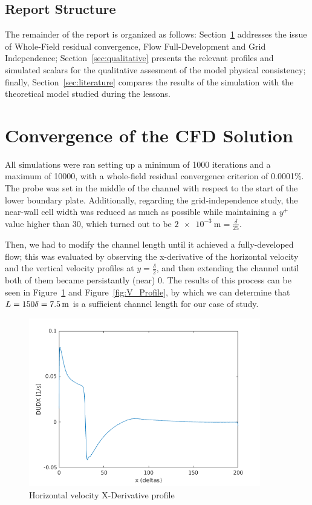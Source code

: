 \documentclass[12pt]{article}
\begin{document}
        \subsection{Report Structure}

                The remainder of the report is organized as follows: Section~\ref{sec:convergence} addresses the issue of Whole-Field residual convergence, Flow Full-Development and Grid Independence; Section~\ref{sec:qualitative} presents the relevant profiles and simulated scalars for the qualitative assesment of the model physical consistency; finally, Section~\ref{sec:literature} compares the results of the simulation with the theoretical model studied during the lessons.

\section{Convergence of the CFD Solution} \label{sec:convergence}

        All simulations were ran setting up a minimum of 1000 iterations and a maximum of 10000, with a whole-field residual convergence criterion of 0.0001\%. The probe was set in the middle of the channel with respect to the start of the lower boundary plate. Additionally, regarding the grid-independence study, the near-wall cell width was reduced as much as possible while maintaining a \( y^+ \) value higher than 30, which turned out to be \( \SI{2e-3}{\metre} = \frac{\delta}{25} \).

        Then, we had to modify the channel length until it achieved a fully-developed flow; this was evaluated by observing the x-derivative of the horizontal velocity and the vertical velocity profiles at $y=\frac{\delta}{2}$, and then extending the channel until both of them became persistantly (near) 0. The results of this process can be seen in Figure~\ref{fig:DUDX_Profile} and Figure~\ref{fig:V_Profile}, by which we can determine that $ L = 150 \delta =  \SI{7.5E0}{\metre}$ is a sufficient channel length for our case of study.

        \begin{figure}[ht!]
                \centering
                \includegraphics[width=0.9\textwidth]{DUDX_Profile.png}
                \caption{Horizontal velocity X-Derivative profile}
                \label{fig:DUDX_Profile}
        \end{figure}
\end{document}
